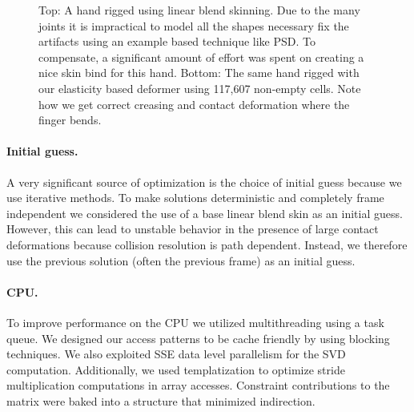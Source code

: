 \begin{figure}[tb]
\caption[A hand rigged using linear blend skinning and our method.]{Top: A hand rigged using linear blend skinning. Due to the many joints
it is impractical to model all the shapes necessary fix the artifacts using an
example based technique like PSD. To compensate, a significant amount of effort was
spent on creating a nice skin bind for this hand. Bottom: The same hand rigged with our
elasticity based deformer using 117,607 non-empty cells. Note how we get correct creasing and contact
deformation where the finger bends.}
\label{fig:hand}
\end{figure}


\paragraph{Initial guess.} A very significant source of optimization is the choice of initial guess because
we use iterative methods.  To make solutions deterministic and completely frame
independent we considered the use of a base linear blend skin as an initial
guess. However, this can lead to unstable behavior in the presence of large
contact deformations because collision resolution is path dependent. Instead, we therefore use the previous
solution (often the previous frame) as an initial guess. 

\paragraph{CPU.} To improve performance on the CPU we utilized multithreading using a task
queue. We designed our access patterns to be cache friendly by using blocking
techniques.  We also exploited SSE data level parallelism for the SVD
computation. Additionally, we used templatization to optimize stride
multiplication computations in array accesses. Constraint contributions to the
matrix were baked into a structure that minimized indirection.

